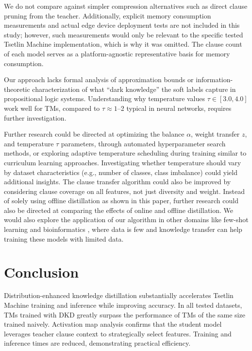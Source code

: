 \documentclass[sn-mathphys-num]{sn-jnl}%
\theoremstyle{thmstyleone}%
\theoremstyle{thmstyletwo}%
\theoremstyle{thmstylethree}%
\begin{document}
 We do not compare against simpler compression alternatives such as direct clause pruning from the teacher. Additionally, explicit memory consumption measurements and actual edge device deployment tests are not included in this study; however, such measurements would only be relevant to the specific tested Tsetlin Machine implementation, which is why it was omitted. The clause count of each model serves as a platform-agnostic representative basis for memory consumption.

 
 Our approach lacks formal analysis of approximation bounds or information-theoretic characterization of what ``dark knowledge'' the soft labels capture in propositional logic systems. Understanding why temperature values $\tau \in [3.0, 4.0]$ work well for TMs, compared to $\tau \approx 1$--2 typical in neural networks, requires further investigation.
 
 Further research could be directed at optimizing the balance $\alpha$, weight transfer $z$, and temperature $\tau$ parameters, through automated hyperparameter search methods, or exploring adaptive temperature scheduling during training similar to curriculum learning approaches. Investigating whether temperature should vary by dataset characteristics (e.g., number of classes, class imbalance) could yield additional insights. The clause transfer algorithm could also be improved by considering clause coverage on all features, not just diversity and weight. Instead of solely using offline distillation as shown in this paper, further research could also be directed at comparing the effects of online and offline distillation. We would also explore the application of our algorithm in other domains like few-shot learning \cite{anjum2025using, DBLP:conf/bigdataconf/GuoAZ22, anjum2025weighted} and bioinformatics \cite{woessner2024identifying}, where data is few and knowledge transfer can help training these models with limited data.
 
\section{Conclusion}
Distribution-enhanced knowledge distillation substantially accelerates Tsetlin Machine training and inference while improving accuracy. In all tested datasets, TMs trained with DKD greatly surpass the performance of TMs of the same size trained naively.
Activation map analysis confirms that the student model leverages teacher clause context to strategically select features. Training and inference times are reduced, demonstrating practical efficiency.
\end{document}
